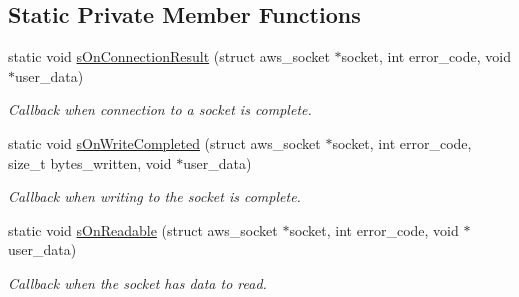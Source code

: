 \subsection*{Static Private Member Functions}
\begin{DoxyCompactItemize}
\item 
\mbox{\label{class_aws_1_1_iot_1_1_device_client_1_1_secure_tunneling_1_1_tcp_forward_a04d36587c626df9c2392fd2f3ff12122}} 
static void \hyperlink{class_aws_1_1_iot_1_1_device_client_1_1_secure_tunneling_1_1_tcp_forward_a04d36587c626df9c2392fd2f3ff12122}{s\+On\+Connection\+Result} (struct aws\+\_\+socket $\ast$socket, int error\+\_\+code, void $\ast$user\+\_\+data)
\begin{DoxyCompactList}\small\item\em Callback when connection to a socket is complete. \end{DoxyCompactList}\item 
\mbox{\label{class_aws_1_1_iot_1_1_device_client_1_1_secure_tunneling_1_1_tcp_forward_a4203de375f36fbde339599d435b511b0}} 
static void \hyperlink{class_aws_1_1_iot_1_1_device_client_1_1_secure_tunneling_1_1_tcp_forward_a4203de375f36fbde339599d435b511b0}{s\+On\+Write\+Completed} (struct aws\+\_\+socket $\ast$socket, int error\+\_\+code, size\+\_\+t bytes\+\_\+written, void $\ast$user\+\_\+data)
\begin{DoxyCompactList}\small\item\em Callback when writing to the socket is complete. \end{DoxyCompactList}\item 
\mbox{\label{class_aws_1_1_iot_1_1_device_client_1_1_secure_tunneling_1_1_tcp_forward_a59535904825ea855774f41f880f0c778}} 
static void \hyperlink{class_aws_1_1_iot_1_1_device_client_1_1_secure_tunneling_1_1_tcp_forward_a59535904825ea855774f41f880f0c778}{s\+On\+Readable} (struct aws\+\_\+socket $\ast$socket, int error\+\_\+code, void $\ast$user\+\_\+data)
\begin{DoxyCompactList}\small\item\em Callback when the socket has data to read. \end{DoxyCompactList}\end{DoxyCompactItemize}
